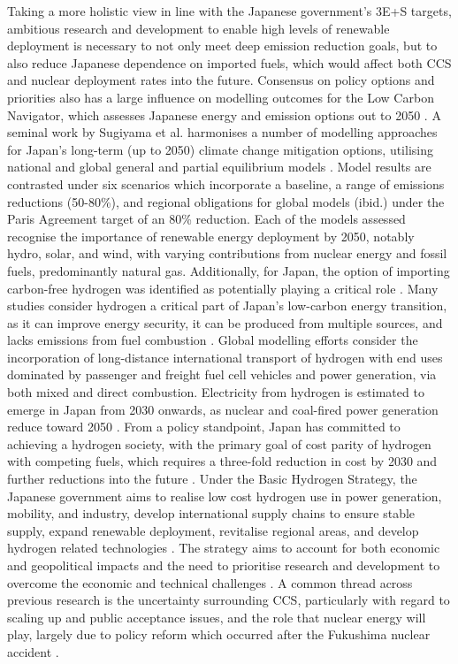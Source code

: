 Taking a more holistic view in line with the Japanese government's 3E+S targets, ambitious research and development to enable high levels of renewable deployment is necessary to not only meet deep emission reduction goals, but to also reduce Japanese dependence on imported fuels, which would affect both CCS and nuclear deployment rates into the future. Consensus on policy options and priorities also has a large influence on modelling outcomes for the Low Carbon Navigator, which assesses Japanese energy and emission options out to 2050 \cite{moinuddin_japan_2019}. A seminal work by Sugiyama et al. harmonises a number of modelling approaches for Japan's long-term (up to 2050) climate change mitigation options, utilising national and global general and partial equilibrium models \cite{sugiyama_japans_2019}. Model results are contrasted under six scenarios which incorporate a baseline, a range of emissions reductions (50-80\%), and regional obligations for global models (ibid.) under the Paris Agreement target of an 80\% reduction. Each of the models assessed recognise the importance of renewable energy deployment by 2050, notably hydro, solar, and wind, with varying contributions from nuclear energy and fossil fuels, predominantly natural gas. Additionally, for Japan, the option of importing carbon-free hydrogen was identified as potentially playing a critical role \cite{akimoto_estimates_2010, matsuo_global_2013, oshiro_diffusion_2015, oshiro_diffusion_2015, sugiyama_japans_2019}. Many studies consider hydrogen a critical part of Japan's low-carbon energy transition, as it can improve energy security, it can be produced from multiple sources, and lacks emissions from fuel combustion \cite{iida_hydrogen_2019}. Global modelling efforts consider the incorporation of long-distance international transport of hydrogen with end uses dominated by passenger and freight fuel cell vehicles and power generation, via both mixed and direct combustion. Electricity from hydrogen is estimated to emerge in Japan from 2030 onwards, as nuclear and coal-fired power generation reduce toward 2050 \cite{ishimoto_significance_2017}. From a policy standpoint, Japan has committed to achieving a hydrogen society, with the primary goal of cost parity of hydrogen with competing fuels, which requires a three-fold reduction in cost by 2030 and further reductions into the future \cite{nagashima_japans_2018}. Under the Basic Hydrogen Strategy, the Japanese government aims to realise low cost hydrogen use in power generation, mobility, and industry, develop international supply chains to ensure stable supply, expand renewable deployment, revitalise regional areas, and develop hydrogen related technologies \cite{meti_basic_2017}. The strategy aims to account for both economic and geopolitical impacts and the need to prioritise research and development to overcome the economic and technical challenges \cite{nagashima_japans_2018}. A common thread across previous research is the uncertainty surrounding \gls{CCS}, particularly with regard to scaling up and public acceptance issues, and the role that nuclear energy will play, largely due to policy reform which occurred after the Fukushima nuclear accident \cite{oshiro_mid-century_2019}.

